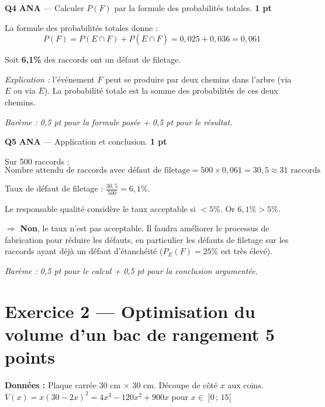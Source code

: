\documentclass[a4paper,11pt]{article}
\newcommand{\pts}[1]{\hfill\textcolor{gris}{\small\textbf{#1}}}
\newcommand{\comp}[1]{\colorbox{blue!10}{\scriptsize\textbf{#1}}}
\begin{document}
\textbf{Q4} \comp{ANA} — Calculer $P(F)$ par la formule des probabilités totales. \pts{1 pt}

\begin{corrbox}
La formule des probabilités totales donne :
\[
P(F) = P(E \cap F) + P(\overline{E} \cap F) = 0{,}025 + 0{,}036 = \boxed{0{,}061}
\]

Soit \textbf{6,1\%} des raccords ont un défaut de filetage.

\smallskip
\textit{Explication :} l'événement $F$ peut se produire par deux chemins dans l'arbre (via $E$ ou via $\overline{E}$). La probabilité totale est la somme des probabilités de ces deux chemins.

\smallskip
\textit{Barème : 0,5 pt pour la formule posée + 0,5 pt pour le résultat.}
\end{corrbox}

\textbf{Q5} \comp{ANA} — Application et conclusion. \pts{1 pt}

\begin{corrbox}
Sur 500 raccords :
\[
\text{Nombre attendu de raccords avec défaut de filetage} = 500 \times 0{,}061 = \boxed{30{,}5 \approx 31 \text{ raccords}}
\]

Taux de défaut de filetage : $\frac{30{,}5}{500} = 6{,}1\%$.

Le responsable qualité considère le taux acceptable si $< 5\%$. Or $6{,}1\% > 5\%$.

$\Rightarrow$ \textbf{Non}, le taux n'est pas acceptable. Il faudra améliorer le processus de fabrication pour réduire les défauts, en particulier les défauts de filetage sur les raccords ayant déjà un défaut d'étanchéité ($P_E(F) = 25\%$ est très élevé).

\smallskip
\textit{Barème : 0,5 pt pour le calcul + 0,5 pt pour la conclusion argumentée.}
\end{corrbox}

\newpage

\section*{Exercice 2 — Optimisation du volume d'un bac de rangement \pts{5 points}}

\begin{contextebox}
\textbf{Données :} Plaque carrée 30 cm $\times$ 30 cm. Découpe de côté $x$ aux coins.\\
$V(x) = x(30-2x)^2 = 4x^3 - 120x^2 + 900x$ pour $x \in \;]0\,;\,15[$
\end{contextebox}
\end{document}
